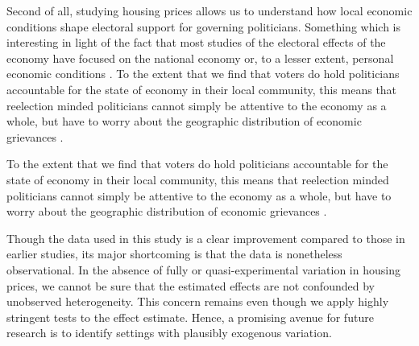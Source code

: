 \documentclass[12pt,a4paper]{article}
\begin{document}
 Second of all, studying housing prices allows us to understand how local economic conditions shape electoral support for governing politicians. Something which is interesting in light of the fact that most studies of the electoral effects of the economy have focused on the national economy or, to a lesser extent, personal economic conditions \citep[290]{healy2013retrospective}. To the extent that we find that voters do hold politicians accountable for the state of economy in their local community, this means that reelection minded politicians cannot simply be attentive to the economy as a whole, but have to worry about the geographic distribution of economic grievances \citep[cf.][11]{ferejohn1986incumbent}. 

 To the extent that we find that voters do hold politicians accountable for the state of economy in their local community, this means that reelection minded politicians cannot simply be attentive to the economy as a whole, but have to worry about the geographic distribution of economic grievances \citep[cf.][11]{ferejohn1986incumbent}. 

Though the data used in this study is a clear improvement compared to those in earlier studies, its major shortcoming is that the data is nonetheless observational. In the absence of fully or quasi-experimental variation in housing prices, we cannot be sure that the estimated effects are not confounded by unobserved heterogeneity. This concern remains even though we apply highly stringent tests to the effect estimate. Hence, a promising avenue for future research is to identify settings with plausibly exogenous variation. 


\end{document}
